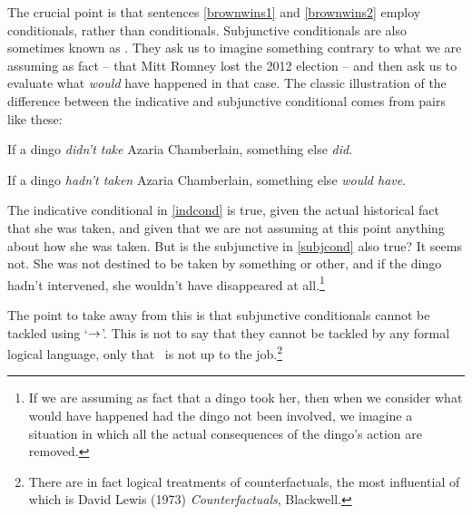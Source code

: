 The crucial point is that sentences \ref{brownwins1} and \ref{brownwins2} employ  conditionals, rather than  conditionals. Subjunctive conditionals are also sometimes known as . They ask us to imagine something contrary to what we are assuming as fact – that Mitt Romney lost the 2012 election – and then ask us to evaluate what \emph{would} have happened in that case. The classic illustration of the difference between the indicative and subjunctive conditional comes from pairs like these:
\begin{earg}
	\item[\ex{indcond}] If a dingo \emph{didn't take} Azaria Chamberlain, something else \emph{did}.
	\item[\ex{subjcond}] If a dingo \emph{hadn't taken} Azaria Chamberlain, something else \emph{would have}.
\end{earg} The indicative conditional in \ref{indcond} is true, given the actual historical fact that she was taken, and given that we are not assuming at this point anything about how she was taken. But is the subjunctive in \ref{subjcond} also true? It seems not. She was not destined to be taken by something or other, and if the dingo hadn't intervened, she wouldn't have disappeared at all.\footnote{If we are assuming as fact that a dingo took her, then when we consider what would have happened had the dingo not been involved, we imagine a situation in which all the actual consequences of the dingo's action are removed.}

The point to take away from this is that subjunctive conditionals cannot be tackled using `$\rightarrow$'. This is not to say that they cannot be tackled by any formal logical language, only that \TFL\ is not up to the job.\footnote{There are in fact logical treatments of counterfactuals, the most influential of which is David Lewis (1973) \emph{Counterfactuals}, Blackwell.}

